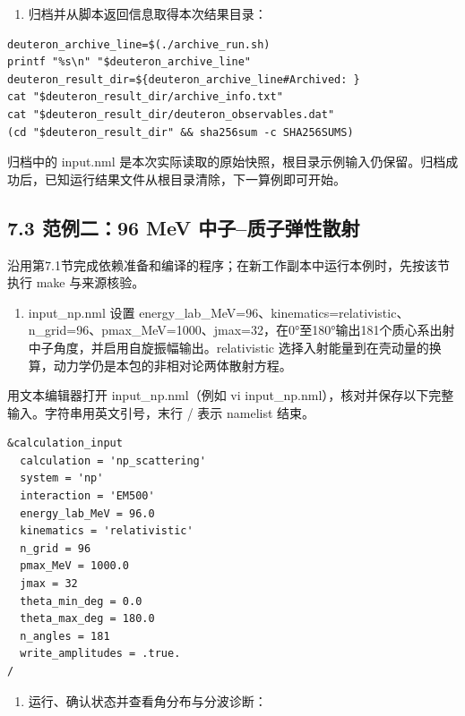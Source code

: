 \documentclass[UTF8,a4paper,zihao=5,fontset=fandol]{ctexart}
\begin{document}
\begin{enumerate}[start=3]
\item 归档并从脚本返回信息取得本次结果目录：


\end{enumerate}

\begin{Verbatim}[samepage=true,breaklines=true,breakanywhere=true,fontsize=\small,frame=leftline,framesep=3mm,rulecolor=\color{bluegray}]
deuteron_archive_line=$(./archive_run.sh)
printf "%s\n" "$deuteron_archive_line"
deuteron_result_dir=${deuteron_archive_line#Archived: }
cat "$deuteron_result_dir/archive_info.txt"
cat "$deuteron_result_dir/deuteron_observables.dat"
(cd "$deuteron_result_dir" && sha256sum -c SHA256SUMS)
\end{Verbatim}
归档中的 {\ttfamily\small input.\allowbreak{}nml} 是本次实际读取的原始快照，根目录示例输入仍保留。归档成功后，已知运行结果文件从根目录清除，下一算例即可开始。

\subsection*{7.3 范例二：96 MeV 中子–质子弹性散射}
沿用第7.1节完成依赖准备和编译的程序；在新工作副本中运行本例时，先按该节执行 {\ttfamily\small make} 与来源核验。

\begin{enumerate}[start=1]
\item {\ttfamily\small input\_\allowbreak{}np.\allowbreak{}nml} 设置 {\ttfamily\small energy\_\allowbreak{}lab\_\allowbreak{}MeV=\allowbreak{}96}、{\ttfamily\small kinematics=\allowbreak{}relativistic}、{\ttfamily\small n\_\allowbreak{}grid=\allowbreak{}96}、{\ttfamily\small pmax\_\allowbreak{}MeV=\allowbreak{}1000}、{\ttfamily\small jmax=\allowbreak{}32}，在0°至180°输出181个质心系出射中子角度，并启用自旋振幅输出。{\ttfamily\small relativistic} 选择入射能量到在壳动量的换算，动力学仍是本包的非相对论两体散射方程。


\end{enumerate}
用文本编辑器打开 {\ttfamily\small input\_\allowbreak{}np.\allowbreak{}nml}（例如 {\ttfamily\small vi input\_\allowbreak{}np.\allowbreak{}nml}），核对并保存以下完整输入。字符串用英文引号，末行 {\ttfamily\small /\allowbreak{}} 表示 namelist 结束。


\begin{Verbatim}[samepage=true,breaklines=true,breakanywhere=true,fontsize=\small,frame=leftline,framesep=3mm,rulecolor=\color{bluegray}]
&calculation_input
  calculation = 'np_scattering'
  system = 'np'
  interaction = 'EM500'
  energy_lab_MeV = 96.0
  kinematics = 'relativistic'
  n_grid = 96
  pmax_MeV = 1000.0
  jmax = 32
  theta_min_deg = 0.0
  theta_max_deg = 180.0
  n_angles = 181
  write_amplitudes = .true.
/
\end{Verbatim}
\begin{enumerate}[start=2]
\item 运行、确认状态并查看角分布与分波诊断：


\end{enumerate}
\end{document}
